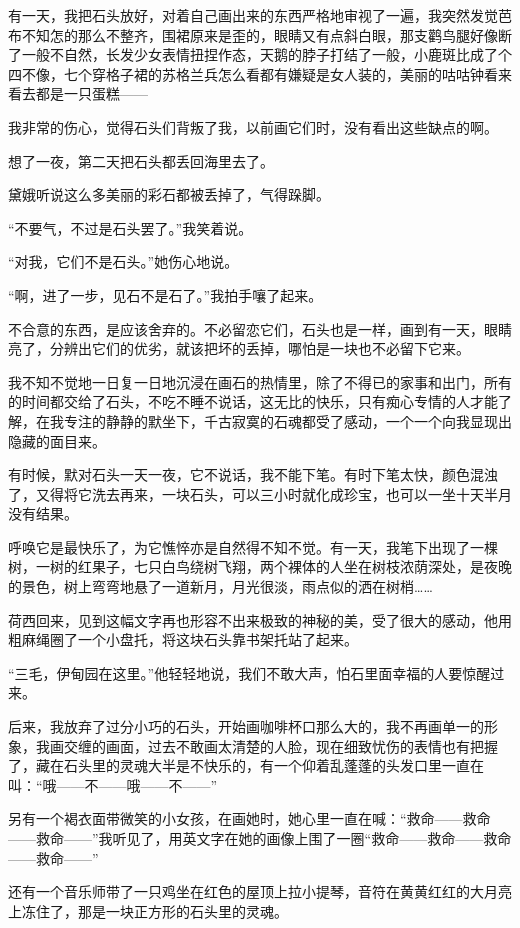 \par 有一天，我把石头放好，对着自己画出来的东西严格地审视了一遍，我突然发觉芭布不知怎的那么不整齐，围裙原来是歪的，眼睛又有点斜白眼，那支鹳鸟腿好像断了一般不自然，长发少女表情扭捏作态，天鹅的脖子打结了一般，小鹿斑比成了个四不像，七个穿格子裙的苏格兰兵怎么看都有嫌疑是女人装的，美丽的咕咕钟看来看去都是一只蛋糕——
\par 我非常的伤心，觉得石头们背叛了我，以前画它们时，没有看出这些缺点的啊。
\par 想了一夜，第二天把石头都丢回海里去了。
\par 黛娥听说这么多美丽的彩石都被丢掉了，气得跺脚。
\par “不要气，不过是石头罢了。”我笑着说。
\par “对我，它们不是石头。”她伤心地说。
\par “啊，进了一步，见石不是石了。”我拍手嚷了起来。
\par 不合意的东西，是应该舍弃的。不必留恋它们，石头也是一样，画到有一天，眼睛亮了，分辨出它们的优劣，就该把坏的丢掉，哪怕是一块也不必留下它来。
\par 我不知不觉地一日复一日地沉浸在画石的热情里，除了不得已的家事和出门，所有的时间都交给了石头，不吃不睡不说话，这无比的快乐，只有痴心专情的人才能了解，在我专注的静静的默坐下，千古寂寞的石魂都受了感动，一个一个向我显现出隐藏的面目来。
\par 有时候，默对石头一天一夜，它不说话，我不能下笔。有时下笔太快，颜色混浊了，又得将它洗去再来，一块石头，可以三小时就化成珍宝，也可以一坐十天半月没有结果。
\par 呼唤它是最快乐了，为它憔悴亦是自然得不知不觉。有一天，我笔下出现了一棵树，一树的红果子，七只白鸟绕树飞翔，两个裸体的人坐在树枝浓荫深处，是夜晚的景色，树上弯弯地悬了一道新月，月光很淡，雨点似的洒在树梢……
\par 荷西回来，见到这幅文字再也形容不出来极致的神秘的美，受了很大的感动，他用粗麻绳圈了一个小盘托，将这块石头靠书架托站了起来。
\par “三毛，伊甸园在这里。”他轻轻地说，我们不敢大声，怕石里面幸福的人要惊醒过来。
\par 后来，我放弃了过分小巧的石头，开始画咖啡杯口那么大的，我不再画单一的形象，我画交缠的画面，过去不敢画太清楚的人脸，现在细致忧伤的表情也有把握了，藏在石头里的灵魂大半是不快乐的，有一个仰着乱蓬蓬的头发口里一直在叫：“哦——不——哦——不——”
\par 另有一个褐衣面带微笑的小女孩，在画她时，她心里一直在喊：“救命——救命——救命——”我听见了，用英文字在她的画像上围了一圈“救命——救命——救命——救命——”
\par 还有一个音乐师带了一只鸡坐在红色的屋顶上拉小提琴，音符在黄黄红红的大月亮上冻住了，那是一块正方形的石头里的灵魂。

